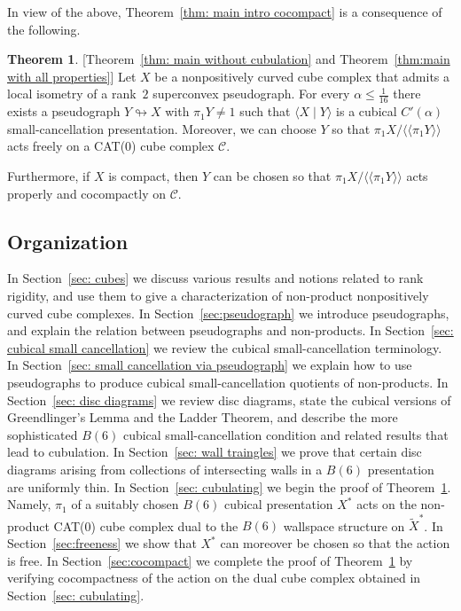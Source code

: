 \documentclass[12pt,oneside]{amsart}
\theoremstyle{definition}
\newtheorem{thm}{Theorem}[section]
\theoremstyle{definition}
\theoremstyle{remark}
\newcommand{\nclose}[1]{\ensuremath{\langle\!\langle#1\rangle\!\rangle}}
\begin{document}
\vspace{10pt}
In view of the above, Theorem~\ref{thm: main intro cocompact} is a consequence of the following.

\begin{thm}\label{thm:main}[Theorem~\ref{thm: main without cubulation} and Theorem~\ref{thm:main with all properties}]
    Let $X$ be a
    nonpositively curved cube complex that admits a local isometry of a rank~$2$ superconvex pseudograph. 
    For every $\alpha \leq \frac 1{16}$ 
    there exists a pseudograph $Y\looparrowright X$ with $\pi_1 Y\neq 1$ such that $\langle X\mid Y\rangle$ is a cubical $C'(\alpha)$ small-cancellation presentation.    Moreover, we can choose $Y$ so that $\pi_1 X / \nclose{ \pi_1 Y}$ acts freely on a CAT(0) cube complex $\mathcal{C}$.

Furthermore, if $X$ is  compact, then
  $Y$ can be chosen so that $\pi_1 X / \nclose{\pi_1 Y}$   acts properly and cocompactly on   $\mathcal{C}$.
\end{thm}


\subsection*{Organization}

In Section~\ref{sec: cubes} we discuss various results and notions  related to rank rigidity, and use them to give a characterization of non-product nonpositively curved cube complexes. 
In Section~\ref{sec:pseudograph} we introduce pseudographs, and explain the relation between pseudographs and non-products.
In Section~\ref{sec: cubical small cancellation} we review the  cubical small-cancellation terminology. 
In Section~\ref{sec: small cancellation via pseudograph} we explain how to use pseudographs to produce cubical small-cancellation quotients of non-products. 
In Section~\ref{sec: disc diagrams} we review disc diagrams, state the cubical versions of Greendlinger's Lemma and the Ladder Theorem, and describe the  more sophisticated $B(6)$ cubical small-cancellation condition and related results that lead to cubulation. 
In Section~\ref{sec: wall traingles} we prove that certain disc diagrams arising from collections of intersecting walls in a $B(6)$ presentation are uniformly thin. 
In Section~\ref{sec: cubulating} we begin the proof of Theorem~\ref{thm:main}. Namely, $\pi_1$ of a suitably chosen $B(6)$ cubical presentation $X^*$ acts on the non-product CAT(0) cube complex dual to the $B(6)$ wallspace structure on $\widetilde X^*$.  
In Section~\ref{sec:freeness} we show that $X^*$  can moreover be chosen so that the action is free. 
In Section~\ref{sec:cocompact} we complete the proof of Theorem~\ref{thm:main} by verifying cocompactness of the action on the dual cube complex obtained in Section~\ref{sec: cubulating}.
\end{document}
